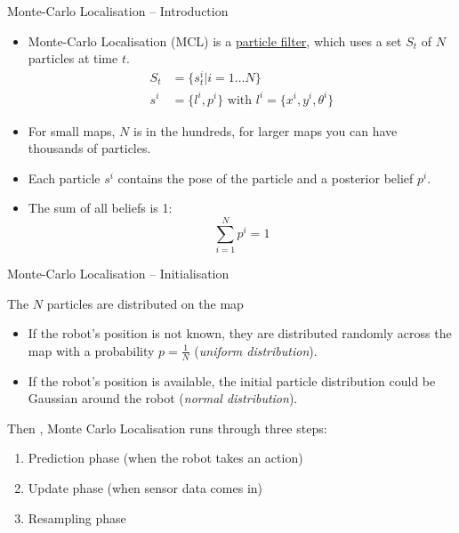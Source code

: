 \documentclass[compress]{beamer}
\begin{document}
\begin{frame}{Monte-Carlo Localisation -- Introduction}

\begin{itemize}
    \item Monte-Carlo Localisation (MCL) is a \href{http://en.wikipedia.org/wiki/Particle_filter}{particle
  filter}, which uses a set $S_t$ of $N$ particles at time
  $t$.
    \begin{align*}
        S_t &= \{s_t^i | i = 1\ldots N\} \\
        s^i &= \{l^i, p^i\} \text{ with } l^i = \{x^i, y^i, \theta^i\}
    \end{align*}
 \item<+-> For small maps, $N$ is in the hundreds, for larger maps you
  can have thousands of particles.
\item<+-> Each particle $s^i$ contains the pose of the particle and a posterior
    belief $p^i$.
\item<+-> The sum of all beliefs is 1: \[ \sum_{i=1}^N p^i = 1 \]
\end{itemize}

\end{frame}

\begin{frame}{Monte-Carlo Localisation -- Initialisation}

The $N$ particles are distributed on the map

\begin{itemize}
\item If the robot's position is not known, they are distributed randomly
    across the map with a probability $p=\frac{1}{N}$ (\emph{uniform
        distribution}).
\item If the robot's position is available, the initial particle
    distribution could be Gaussian around the robot (\emph{normal distribution}).
\end{itemize}

\pause 

Then , Monte Carlo Localisation runs through three steps:

\begin{enumerate}
\item Prediction phase (when the robot takes an action)
\item Update phase (when sensor data comes in)
\item Resampling phase
\end{enumerate}

\end{frame}
\end{document}
